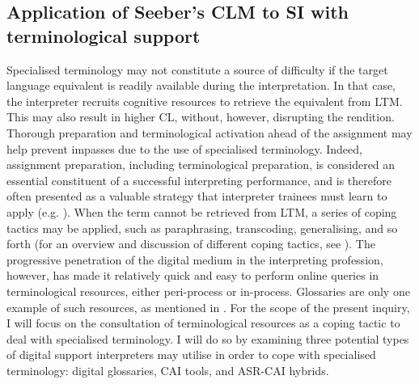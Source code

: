 \subsection{Application of Seeber's CLM to SI with terminological support} \label{description_mymodel}\largerpage
Specialised terminology may not constitute a source of difficulty if the target language equivalent is readily available during the interpretation. In that case, the interpreter recruits cognitive resources to retrieve the equivalent from LTM. This may also result in higher CL, without, however, disrupting the rendition. Thorough preparation and terminological activation ahead of the assignment may help prevent impasses due to the use of specialised terminology. Indeed, assignment preparation, including terminological preparation, is considered an essential constituent of a successful interpreting performance, and is therefore often presented as a valuable strategy that interpreter trainees must learn to apply (e.g. \citealt{gile_basic_2009}). When the term cannot be retrieved from LTM, a series of coping tactics may be applied, such as paraphrasing, transcoding, generalising, and so forth (for an overview and discussion of different coping tactics, see \citealt{gile_basic_2009}). The progressive penetration of the digital medium in the interpreting profession, however, has made it relatively quick and easy to perform online queries in terminological resources, either peri-process or in-process. Glossaries are only one example of such resources, as mentioned in . For the scope of the present inquiry, I will focus on the consultation of terminological resources as a coping tactic \citep[203]{gile_basic_2009} to deal with specialised terminology. I will do so by examining three potential types of digital support interpreters may utilise in order to cope with specialised terminology: digital glossaries, CAI tools, and ASR-CAI hybrids.

